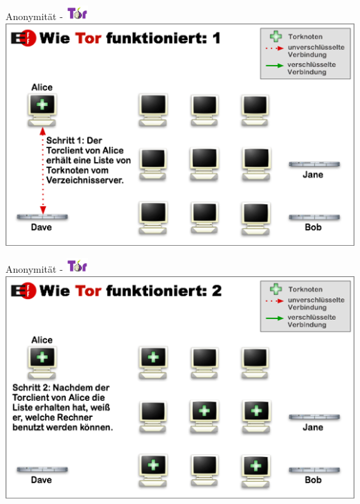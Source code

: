 \documentclass{beamer}
\begin{document}
\begin{frame}{Anonymität - \includegraphics[align=c,height=1.5em]{tor.jpg}}
    \centering\includegraphics[height=0.7\textheight]{tor1.png}
\end{frame}

\begin{frame}{Anonymität - \includegraphics[align=c,height=1.5em]{tor.jpg}}
    \centering\includegraphics[height=0.7\textheight]{tor2.png}
\end{frame}
\end{document}
